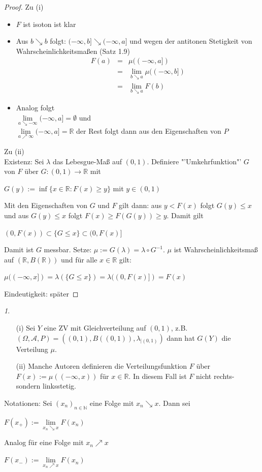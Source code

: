 \documentclass[10pt,a4paper]{report}
\newcommand{\N}{\mathbb{N}}
\newcommand{\R}{\mathbb{R}}
\numberwithin{equation}{section}
\numberwithin{figure}{section}
\theoremstyle{plain}
\theoremstyle{definition}
\theoremstyle{remark}
\newtheorem{rem}[thm]{\protect\remarkname}
\theoremstyle{plain}
\providecommand{\remarkname}{Bemerkung}
\newcommand{\1}{ \mathbb{1} } %
\begin{document}
\begin{proof}
  Zu (i)
  \begin{itemize}
  \item $F$ ist isoton ist klar
  \item Aus $b \searrow b$ folgt: $(-\infty,b] \searrow (-\infty,a]$
    und wegen der antitonen Stetigkeit von Wahrscheinlichkeitsmaßen (Satz 1.9)
    \begin{eqnarray*}
      F(a)&=&\mu((-\infty,a])\\
      &=& \lim\limits_{b\searrow a} \mu((-\infty,b]) \\
      &=& \lim\limits_{b\searrow a} F(b)
    \end{eqnarray*}
  \item Analog folgt\\
    $\lim\limits_{a\searrow -\infty} (-\infty,a]=\emptyset$ und\\
    $\lim\limits_{a\nearrow \infty} (-\infty,a]=\R$ der Rest folgt
    dann aus den Eigenschaften von $P$
  \end{itemize}
  Zu (ii)\\
  Existenz: Sei $\lambda$ das Lebesgue-Maß auf $(0,1)$. Definiere
  "'Umkehrfunktion"' $G$ von $F$ über $G:(0,1) \to \R$ mit
  \begin{center}
    $G(y):=\inf\{x \in \R:F(x)\geq y\}$ mit $y \in (0,1)$
  \end{center}
  Mit den Eigenschaften von $G$ und $F$ gilt dann: aus $y<F(x)$ folgt
  $G(y)\leq x$ und aus $G(y)\leq x$ folgt $F(x)\geq F(G(y))\geq
  y$. Damit gilt
  \begin{center}
    $(0,F(x)) \subset \{G\leq x\}\subset (0,F(x)]$
  \end{center}
  Damit ist $G$ messbar. Setze: $\mu:=G(\lambda)=\lambda\circ
  G^{-1}$. $\mu$ ist Wahrscheinlichkeitsmaß auf $(\R,B(\R))$ und für alle $x \in \R$
  gilt:
  \begin{center}
    $\mu((-\infty,x])=\lambda(\{G\leq x\})=\lambda((0,F(x)])=F(x)$
  \end{center}
  Eindeutigkeit: später
\end{proof}
\begin{rem}
  \begin{itemize}
  \item[(i)] Sei $Y$ eine ZV mit Gleichverteilung auf $(0,1)$,
    z.B. $(\Omega,\mathcal{A},P)=((0,1),B((0,1)),\lambda_{|(0,1)})$
    dann hat $G(Y)$ die Verteilung $\mu$.
  \item[(ii)] Manche Autoren definieren die Verteilungsfunktion $F$
    über $F(x):=\mu((-\infty,x))$ für $x \in \R$. In diesem Fall ist
    $F$ nicht rechts- sondern linksstetig.
  \end{itemize}
  Notationen: Sei $(x_n)_{n \in \N}$ eine Folge mit $x_n\searrow
  x$. Dann sei
  \begin{center}
    $F(x_+):=\lim\limits_{x_n\searrow x} F(x_n)$
  \end{center}
  Analog für eine Folge mit $x_n\nearrow x$
  \begin{center}
    $F(x_-):=\lim\limits_{x_n\nearrow x} F(x_n)$
  \end{center}
\end{rem}
\end{document}
